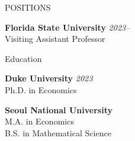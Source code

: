 


\medskip
\address{P.O. Box 3062160, 113 Collegiate Loop, Tallahassee, Florida, 32306-2160}  %

\address{ \href{mailto:ykim22@fsu.edu}{ykim22@fsu.edu} \\ \href{https://sites.google.com/view/yonggyun-yg-kim/}{https://sites.google.com/view/yonggyun-yg-kim} } %
\address{Department of Economics	Florida State University}  %





\begin{rSection}{POSITIONS}
	
	{\bf Florida State University} \hfill 
	{\em 2023--} 
	\\ 
	Visiting Assistant Professor \smallskip
	
	
\end{rSection}



\medskip



\begin{rSection}{Education}
	
	{\bf Duke University} \hfill 
	{\em 2023 } 
	\\ 
	Ph.D. in Economics \smallskip
	
	
	{\bf Seoul National University} \hfill 
	\\
	M.A. in Economics
	\\
	B.S. in Mathematical Science
	
\end{rSection}

\medskip


